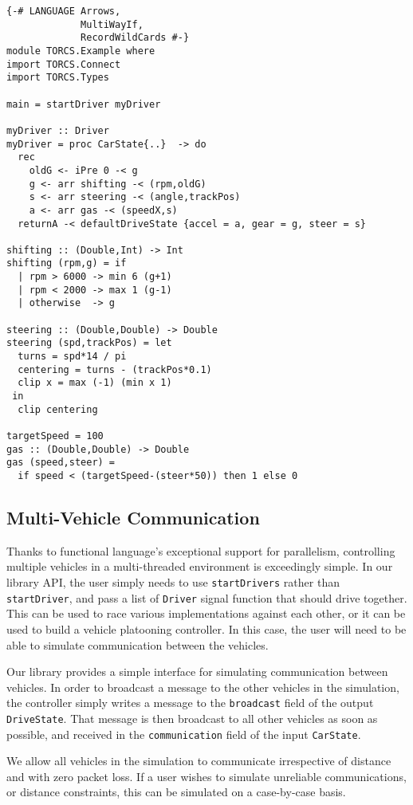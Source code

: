\begin{lstlisting}[float,floatplacement=TR,caption=A complete basic controller in Yampa, label=lst:driver]
{-# LANGUAGE Arrows,
             MultiWayIf,
             RecordWildCards #-}
module TORCS.Example where
import TORCS.Connect
import TORCS.Types

main = startDriver myDriver

myDriver :: Driver
myDriver = proc CarState{..}  -> do
  rec 
    oldG <- iPre 0 -< g
    g <- arr shifting -< (rpm,oldG)
    s <- arr steering -< (angle,trackPos)
    a <- arr gas -< (speedX,s)
  returnA -< defaultDriveState {accel = a, gear = g, steer = s}

shifting :: (Double,Int) -> Int
shifting (rpm,g) = if 
  | rpm > 6000 -> min 6 (g+1)
  | rpm < 2000 -> max 1 (g-1)
  | otherwise  -> g
 
steering :: (Double,Double) -> Double
steering (spd,trackPos) = let
  turns = spd*14 / pi
  centering = turns - (trackPos*0.1)
  clip x = max (-1) (min x 1)
 in
  clip centering

targetSpeed = 100
gas :: (Double,Double) -> Double
gas (speed,steer) = 
  if speed < (targetSpeed-(steer*50)) then 1 else 0
\end{lstlisting}


\subsection{Multi-Vehicle Communication}

Thanks to functional language's exceptional support for parallelism, controlling multiple vehicles in a multi-threaded environment is exceedingly simple. 
In our library API, the user simply needs to use \texttt{startDrivers} rather than \texttt{startDriver}, and pass a list of \texttt{Driver} signal function that should drive together.
This can be used to race various implementations against each other, or it can be used to build a vehicle platooning controller.
In this case, the user will need to be able to simulate communication between the vehicles.

Our library provides a simple interface for simulating communication between vehicles.
In order to broadcast a message to the other vehicles in the simulation, the controller simply writes a message to the \texttt{broadcast} field of the output \texttt{DriveState}.
That message is then broadcast to all other vehicles as soon as possible, and received in the \texttt{communication} field of the input \texttt{CarState}.

We allow all vehicles in the simulation to communicate irrespective of distance and with zero packet loss.
If a user wishes to simulate unreliable communications, or distance constraints, this can be simulated on a case-by-case basis.
